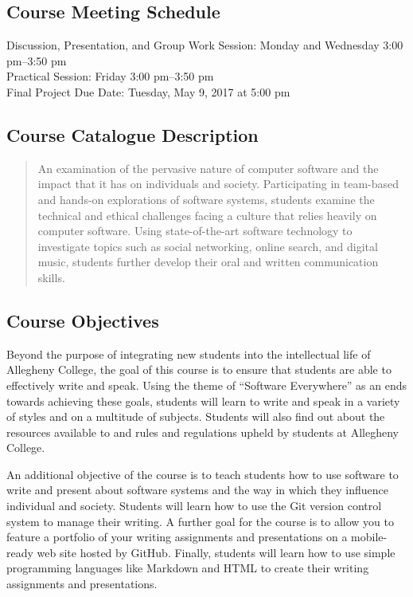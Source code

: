 \subsection*{Course Meeting Schedule}

Discussion, Presentation, and Group Work Session: Monday and Wednesday 3:00 pm--3:50 pm \\
Practical Session: Friday 3:00 pm--3:50 pm \\
Final Project Due Date: Tuesday, May 9, 2017 at 5:00 pm

\subsection*{Course Catalogue Description}

\begin{quote}

An examination of the pervasive nature of computer software and the impact that it has on individuals and society.
Participating in team-based and hands-on explorations of software systems, students examine the technical and ethical
challenges facing a culture that relies heavily on computer software. Using state-of-the-art software technology to
investigate topics such as social networking, online search, and digital music, students further develop their oral and
written communication skills.

\end{quote}

\subsection*{Course Objectives}

Beyond the purpose of integrating new students into the intellectual life of Allegheny College, the goal of this course
is to ensure that students are able to effectively write and speak. Using the theme of ``Software Everywhere'' as an
ends towards achieving these goals, students will learn to write and speak in a variety of styles and on a multitude of
subjects. Students will also find out about the resources available to and rules and regulations upheld by students at
Allegheny College.

An additional objective of the course is to teach students how to use software to write and present about software
systems and the way in which they influence individual and society. Students will learn how to use the Git version
control system to manage their writing. A further goal for the course is to allow you to feature a portfolio of your
writing assignments and presentations on a mobile-ready web site hosted by GitHub. Finally, students will learn how to
use simple programming languages like Markdown and HTML to create their writing assignments and presentations.

